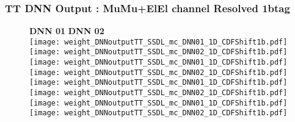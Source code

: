 \documentclass[9pt]{beamer}
\begin{document}
\begin{frame}
	\frametitle{TT DNN Output : MuMu+ElEl channel Resolved 1btag}
	\begin{figure}
	    \textbf{DNN 01} \hspace{1.2cm} \textbf{DNN 02}    \\
        \centering
		\texttt{[image: weight\_DNNoutputTT\_SSDL\_mc\_DNN01\_1D\_CDFShift1b.pdf]}
		\texttt{[image: weight\_DNNoutputTT\_SSDL\_mc\_DNN02\_1D\_CDFShift1b.pdf]}
        \\
		\texttt{[image: weight\_DNNoutputTT\_SSDL\_mc\_DNN01\_1D\_CDFShift1b.pdf]}
		\texttt{[image: weight\_DNNoutputTT\_SSDL\_mc\_DNN02\_1D\_CDFShift1b.pdf]}
        \\
		\texttt{[image: weight\_DNNoutputTT\_SSDL\_mc\_DNN01\_1D\_CDFShift1b.pdf]}
		\texttt{[image: weight\_DNNoutputTT\_SSDL\_mc\_DNN02\_1D\_CDFShift1b.pdf]}
        \\
		\texttt{[image: weight\_DNNoutputTT\_SSDL\_mc\_DNN01\_1D\_CDFShift1b.pdf]}
		\texttt{[image: weight\_DNNoutputTT\_SSDL\_mc\_DNN02\_1D\_CDFShift1b.pdf]}
        \\
	\end{figure}
\end{frame}
\end{document}
